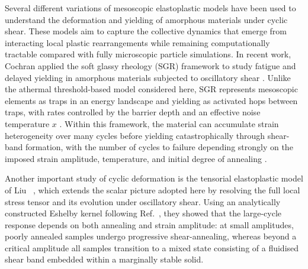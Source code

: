Several different variations of mesoscopic elastoplastic models have been used to understand the deformation and yielding of amorphous materials under cyclic shear. These models aim to capture the collective dynamics that emerge from interacting local plastic rearrangements while remaining computationally tractable compared with fully microscopic particle simulations. In recent work, Cochran \etal applied the soft glassy rheology (SGR) framework to study fatigue and delayed yielding in amorphous materials subjected to oscillatory shear \cite{cochran_slow_2024}. Unlike the athermal threshold-based model considered here, SGR represents mesoscopic elements as traps in an energy landscape and yielding as activated hops between traps, with rates controlled by the barrier depth and an effective noise temperature $x$ \cite{sollich_rheological_1998,sollich_rheology_1997}. Within this framework, the material can accumulate strain heterogeneity over many cycles before yielding catastrophically through shear-band formation, with the number of cycles to failure depending strongly on the imposed strain amplitude, temperature, and initial degree of annealing \cite{cochran_slow_2024}.

Another important study of cyclic deformation is the tensorial elastoplastic model of Liu \etal~\cite{liuFateShearoscillatedAmorphous2022}, which extends the scalar picture adopted here by resolving the full local stress tensor and its evolution under oscillatory shear. Using an analytically constructed Eshelby kernel following Ref.~\cite{caoSoftModesStrain2018}, they showed that the large-cycle response depends on both annealing and strain amplitude: at small amplitudes, poorly annealed samples undergo progressive shear-annealing, whereas beyond a critical amplitude all samples transition to a mixed state consisting of a fluidised shear band embedded within a marginally stable solid.


